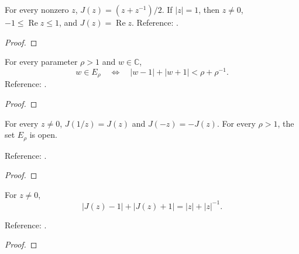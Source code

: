 \begin{supporting}

\begin{theorem}
\label{thm:joukowski-characterization}
\leanok
For every nonzero $z$, $J(z)=(z+z^{-1})/2$.
If $|z|=1$, then $z\ne0$, $-1\le\operatorname{Re}z\le1$, and
$J(z)=\operatorname{Re}z$.
Reference: \cite[Chapter 8]{atap}.
\end{theorem}
\begin{proof}
\leanok
\end{proof}

\begin{theorem}
\label{thm:ellipse-characterization}
\leanok
For every parameter $\rho>1$ and $w\in\mathbb C$,
\[
w\in E_\rho\quad\Longleftrightarrow\quad
|w-1|+|w+1|<\rho+\rho^{-1}.
\]
Reference: \cite[Chapter 8]{atap}.
\end{theorem}
\begin{proof}
\leanok
\end{proof}

\begin{theorem}
\label{thm:joukowski-ellipse-basic}
\leanok
For every $z\ne0$, $J(1/z)=J(z)$ and $J(-z)=-J(z)$. For every $\rho>1$, the set
$E_\rho$ is open.

Reference: \cite[Chapter 8]{atap}.
\end{theorem}
\begin{proof}
\leanok
\end{proof}

\begin{theorem}
\label{thm:joukowski-foci}
\leanok
For $z\ne0$,
\[|J(z)-1|+|J(z)+1|=|z|+|z|^{-1}.\]

Reference: \cite[Chapter 8]{atap}.
\end{theorem}
\begin{proof}
\leanok
\end{proof}


\end{supporting}
